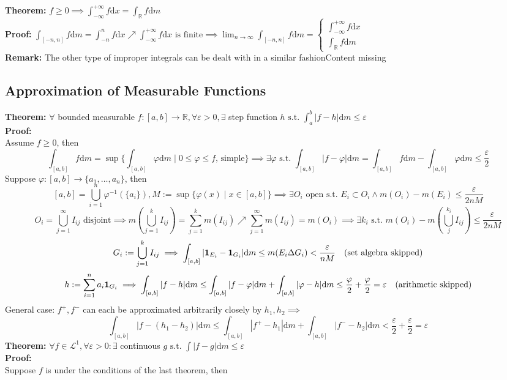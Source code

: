 \documentclass{article}
\newcommand{\R}{\mathbb{R}}
\newcommand{\sumjinf}{\displaystyle\sum_{j=1}^\infty}
\newcommand{\cupjinf}{\displaystyle\bigcup_{j=1}^\infty}
\newcommand{\sumin}{\displaystyle\sum_{i=1}^n}
\newcommand{\sumjk}{\displaystyle\sum_{j=1}^k}
\newcommand{\cupin}{\displaystyle\bigcup_{i=1}^n}
\newcommand{\cupjk}{\displaystyle\bigcup_{j=1}^k}
\newcommand{\limninf}{\displaystyle\lim_{n\to\infty}}
\newcommand{\st}{\mbox{ s.t. }}
\newcommand{\0}{{\bf{0}}}
\newcommand{\1}{{\bf{1}}}
\newcommand{\dint}{\displaystyle\int}
\newcommand{\dif}{\mbox{d}}
\newcommand{\incto}{\nearrow}
\begin{document}
\textbf{Theorem:} $f\geq0\implies\dint_{-\infty}^{+\infty}f\dif x=\dint_\R f\dif m$\\
\textbf{Proof:} $\dint_{[-n,n]}f\dif m=\dint_{-n}^nf\dif x\incto\dint_{-\infty}^{+\infty}f\dif x\mbox{ is finite}\implies\limninf\int_{[-n,n]}f\dif m=\begin{cases}
    \dint_{-\infty}^{+\infty}f\dif x\\[8pt]
    \dint_\R f\dif m
\end{cases}$\\
\textbf{Remark:} The other type of improper integrals can be dealt with in a similar fashion\null\hfill{Content missing}
\subsection{Approximation of Measurable Functions}
\textbf{Theorem:} $\forall$ bounded measurable $f:[a,b]\to\R,\forall\varepsilon>0,\exists$ step function $h\st\dint_a^b|f-h|\dif m\le\varepsilon$\\
\textbf{Proof:}\\
Assume $f\geq0$, then 
$$\dint_{[a,b]}f\dif m=\sup\{\int_{[a,b]}\varphi\dif m\mid0\le\varphi\le f\mbox{, simple}\}\implies\exists\varphi\st\dint_{[a,b]}|f-\varphi|\dif m=\dint_{[a,b]}f\dif m-\dint_{[a,b]}\varphi\dif m\le\frac{\varepsilon}{2}$$
Suppose $\varphi:[a,b]\to\{a_1,\dots,a_n\}$, then
$$[a,b]=\cupin\varphi^{-1}(\{a_i\}),M:=\sup\{\varphi(x)\mid x\in[a,b]\}\implies\exists O_i\mbox{ open}\st E_i\subset O_i\land m(O_i)-m(E_i)\le\frac{\varepsilon}{2nM}$$
$$O_i=\cupjinf I_{ij}\mbox{ disjoint}\implies m(\cupjk I_{ij})=\sumjk m(I_{ij})\incto\sumjinf m(I_{ij})=m(O_i)\implies\exists k_i\st m(O_i)-m(\bigcup_j^{k_i}I_{ij})\le\frac{\varepsilon}{2nM}$$
$$G_i:=\cupjk I_{ij}\implies\int_{[a,b]}|\1_{E_i}-\1_{G_i}|\dif m\le m(E_i\Delta G_i)<\frac{\varepsilon}{nM}\quad(\mbox{set algebra skipped})$$
$$h:=\sumin a_i\1_{G_i}\implies\int_{[a,b]}|f-h|\dif m\le\int_{[a,b]}|f-\varphi|\dif m+\int_{[a,b]}|\varphi-h|\dif m\le\frac{\varphi}{2}+\frac{\varphi}{2}=\varepsilon\quad(\mbox{arithmetic skipped})$$
General case: $f^+,f^-$ can each be approximated arbitrarily closely by $h_1,h_2\implies$
$$\dint_{[a,b]}|f-(h_1-h_2)|\dif m\le\dint_{[a,b]}|f^+-h_1|\dif m+\dint_{[a,b]}|f^--h_2|\dif m<\frac{\varepsilon}{2}+\frac{\varepsilon}{2}=\varepsilon$$
\textbf{Theorem:} $\forall f\in\mathcal{L}^1,\forall\varepsilon>0:\exists$ continuous $g\st\dint|f-g|\dif m\le\varepsilon$\\
\textbf{Proof:}\\
Suppose $f$ is under the conditions of the last theorem, then
\end{document}
